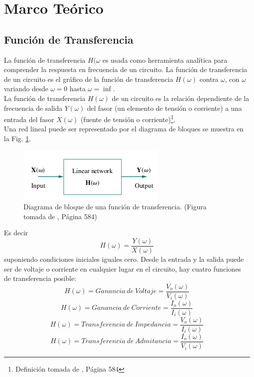 \documentclass[twocolumn]{IEEEtran}
\begin{document}
\section{Marco Teórico}
\noindent
\subsection{Función de Transferencia}
\noindent
La función de transferencia $H(\omega$ es usada como herramienta analítica para comprender la respuesta en frecuencia de un circuito. La función de transferencia de un circuito es el gráfico de la función de transferencia $H(\omega)$ contra $\omega$, con $\omega$ variando desde $\omega = 0$ hasta $\omega = \inf$.\\
La función de transferencia $H(\omega)$ de un circuito es la relación dependiente de la frecuencia de salida $Y(\omega)$ del fasor (un elemento de tensión o corriente) a una entrada del fasor $X(\omega)$ (fuente de tensión o corriente)\footnote{Definición tomada de \cite{sadiku}, Página 584}.\\
Una red lineal puede ser representado por el diagrama de bloques se muestra en la Fig. \ref{fig1}.
\begin{figure}[H]
	\centering
		\includegraphics[scale=0.8]{bloquehs.png}
	\caption{Diagrama de bloque de una función de transferencia. (Figura tomada de \cite{sadiku}, Página 584)}
	\label{fig1}
\end{figure}
\noindent
Es decir
\begin{equation}
 H(\omega) = \frac{Y(\omega)}{X(\omega)}
\label{ecu1}
\end{equation}
\noindent
suponiendo condiciones iniciales iguales cero. Desde la entrada y la salida puede ser de voltaje o corriente en cualquier lugar en el circuito, hay cuatro funciones de transferencia posible:
\begin{equation}
 H(\omega) = Ganancia\ de\ Voltaje = \frac{V_{o}(\omega)}{V_{i}(\omega)}
\label{ecu2}
\end{equation}
\begin{equation}
 H(\omega) = Ganancia\ de\ Corriente = \frac{I_{o}(\omega)}{I_{i}(\omega)}
\label{ecu3}
\end{equation}
\begin{equation}
 H(\omega) = Transferencia\ de\ Impedancia = \frac{V_{o}(\omega)}{I_{i}(\omega)}
\label{ecu4}
\end{equation}
\begin{equation}
 H(\omega) = Transferencia\ de\ Admitancia = \frac{I_{o}(\omega)}{V_{i}(\omega)}
\label{ecu5}
\end{equation}
\end{document}
